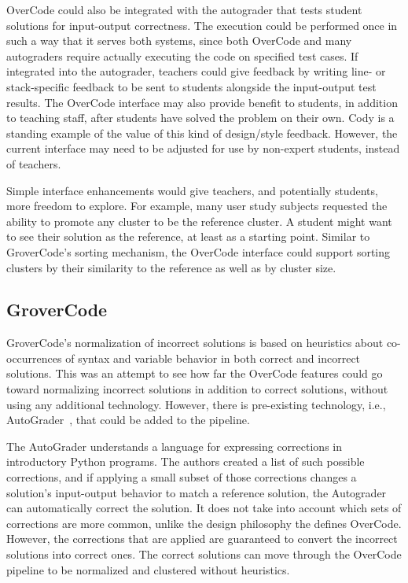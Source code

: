 OverCode could also be integrated with the autograder that tests student solutions for input-output correctness. The execution could be performed once in such a way that it serves both systems, since both OverCode and many autograders require actually executing the code on specified test cases. If integrated into the autograder, teachers could give feedback by writing line- or stack-specific feedback to be sent to students alongside the input-output test results. The OverCode interface may also provide benefit to students, in addition to teaching staff, after students have solved the problem on their own. Cody is a standing example of the value of this kind of design/style feedback. However, the current interface may need to be adjusted for use by non-expert students, instead of teachers. %

Simple interface enhancements would give teachers, and potentially students, more freedom to explore. For example, many user study subjects requested the ability to promote any cluster to be the reference cluster. A student might want to see their solution as the reference, at least as a starting point. Similar to GroverCode's sorting mechanism, the OverCode interface could support sorting clusters by their similarity to the reference as well as by cluster size. 


\subsection{GroverCode}

GroverCode's normalization of incorrect solutions is based on heuristics about co-occurrences of syntax and variable behavior in both correct and incorrect solutions. This was an attempt to see how far the OverCode features could go toward normalizing incorrect solutions in addition to correct solutions, without using any additional technology. However, there is pre-existing technology, i.e., AutoGrader~\cite{autograder}, that could be added to the pipeline. 

The AutoGrader understands a language for expressing corrections in introductory Python programs. The authors created a list of such possible corrections, and if applying a small subset of those corrections changes a solution's input-output behavior to match a reference solution, the Autograder can automatically correct the solution. It does not take into account which sets of corrections are more common, unlike the design philosophy the defines OverCode. However, the corrections that are applied are guaranteed to convert the incorrect solutions into correct ones. The correct solutions can move through the OverCode pipeline to be normalized and clustered without heuristics. 

